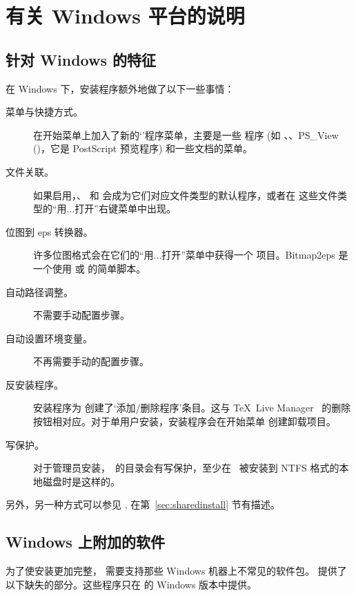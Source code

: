 \documentclass{article}
\begin{document}
\section{有关 Windows 平台的说明}
\label{sec:windows}

\subsection{针对 Windows 的特征}
\label{sec:winfeatures}

在 Windows 下，安装程序额外地做了以下一些事情：
\begin{description}
\item[菜单与快捷方式。] 在开始菜单上加入了新的`\TL{}'程序菜单，主要是一些
\GUI{} 程序 (如 、、PS\_View ()，它是
PostScript 预览程序) 和一些文档的菜单。
\item[文件关联。] 如果启用，、
和  会成为它们对应文件类型的默认程序，或者在
这些文件类型的“用...打开”右键菜单中出现。
\item[位图到 eps 转换器。] 许多位图格式会在它们的“用...打开”菜单中获得一个
   项目。Bitmap2eps 是一个使用  或
   的简单脚本。
\item[自动路径调整。] 不需要手动配置步骤。
\item[自动设置环境变量。] 不再需要手动的配置步骤。
\item[反安装程序。] 安装程序为 \TL{} 创建了`添加/删除程序'条目。这与
\TeX\ Live Manager \GUI\ 的删除按钮相对应。对于单用户安装，安装程序会在开始菜单
创建卸载项目。
\item[写保护。] 对于管理员安装，\TL\ 的目录会有写保护，至少在 \TL\ 被安装到 NTFS
格式的本地磁盘时是这样的。
\end{description}

另外，另一种方式可以参见 , 在第~\ref{sec:sharedinstall} 节有描述。

\subsection{Windows 上附加的软件}

为了使安装更加完整，\TL{} 需要支持那些 Windows 机器上不常见的软件包。
\TL{} 提供了以下缺失的部分。这些程序只在 \TL{} 的 Windows 版本中提供。
\end{document}
